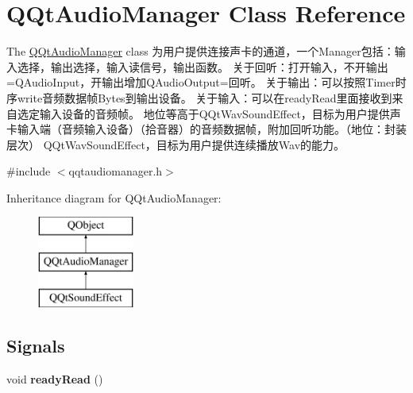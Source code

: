 \hypertarget{class_q_qt_audio_manager}{}\section{Q\+Qt\+Audio\+Manager Class Reference}
\label{class_q_qt_audio_manager}


The \mbox{\hyperlink{class_q_qt_audio_manager}{Q\+Qt\+Audio\+Manager}} class 为用户提供连接声卡的通道，一个\+Manager包括：输入选择，输出选择，输入读信号，输出函数。 关于回听：打开输入，不开输出=Q\+Audio\+Input，开输出增加\+Q\+Audio\+Output=回听。 关于输出：可以按照\+Timer时序write音频数据帧\+Bytes到输出设备。 关于输入：可以在ready\+Read里面接收到来自选定输入设备的音频帧。 地位等高于\+Q\+Qt\+Wav\+Sound\+Effect，目标为用户提供声卡输入端（音频输入设备）（拾音器）的音频数据帧，附加回听功能。（地位：封装层次） Q\+Qt\+Wav\+Sound\+Effect，目标为用户提供连续播放\+Wav的能力。  




{\ttfamily \#include $<$qqtaudiomanager.\+h$>$}

Inheritance diagram for Q\+Qt\+Audio\+Manager\+:\begin{figure}[H]
\begin{center}
\leavevmode
\includegraphics[height=3.000000cm]{class_q_qt_audio_manager}
\end{center}
\end{figure}
\subsection*{Signals}
\begin{DoxyCompactItemize}
\item 
\mbox{\label{class_q_qt_audio_manager_addec5c23fbb3eff8adc436ff9c3e7dcc}} 
void {\bfseries ready\+Read} ()
\end{DoxyCompactItemize}
